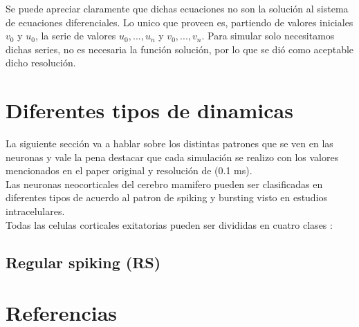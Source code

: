 \documentclass[12pt]{article}
\begin{document}
Se puede apreciar claramente que dichas ecuaciones no son la solución al sistema de ecuaciones diferenciales. Lo unico que proveen es, partiendo de valores iniciales $v_0$ y $u_0$,
la serie de valores $u_0,...,u_n$ y $v_0,...,v_n$. Para simular solo necesitamos dichas series, no es necesaria la función solución, por lo que se dió como aceptable dicho resolución.

\section{Diferentes tipos de dinamicas}

La siguiente sección va a hablar sobre los distintas patrones que se ven en las neuronas y vale la pena destacar que cada simulación se realizo con los valores
mencionados en el paper original y resolución de (0.1 ms). \\

Las neuronas neocorticales del cerebro mamifero pueden ser clasificadas en diferentes tipos de acuerdo al patron de spiking y bursting visto en estudios intracelulares. \\
Todas las celulas corticales exitatorias pueden ser divididas en cuatro clases \cite{firingPatters} \cite{chatteringCells}:
\newpage
\subsection{Regular spiking (RS)}
\newpage

\section{Referencias}
\end{document}
